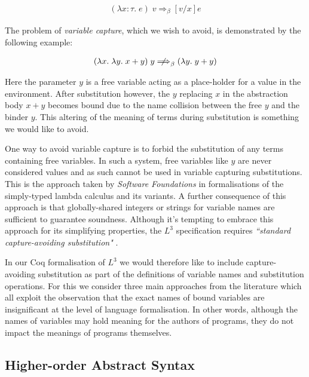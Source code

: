 \documentclass[]{unswthesis}
\let\i\textit
\begin{document}
\begin{eqnarray*}
(\lambda x : \tau. \; e) \; v \Longrightarrow_\beta [v/x]e
\end{eqnarray*}

The problem of \i{variable capture}, which we wish to avoid, is demonstrated by the following example:

\begin{eqnarray*}
(\lambda x. \; \lambda y. \; x + y) \; y \; {\centernot\Longrightarrow}_\beta \; (\lambda y. \; y + y)
\end{eqnarray*}

Here the parameter $y$ is a free variable acting as a place-holder for a value in the environment. After substitution however, the $y$ replacing $x$ in the abstraction body $x + y$ becomes bound due to the name collision between the free $y$ and the binder $y$. This altering of the meaning of terms during substitution is something we would like to avoid.

One way to avoid variable capture is to forbid the substitution of any terms containing free variables. In such a system, free variables like $y$ are never considered values and as such cannot be used in variable capturing substitutions. This is the approach taken by \i{Software Foundations} \cite{pierce15} in formalisations of the simply-typed lambda calculus and its variants. A further consequence of this approach is that globally-shared integers or strings for variable names are sufficient to guarantee soundness. Although it's tempting to embrace this approach for its simplifying properties, the $L^3$ specification requires \i{``standard capture-avoiding substitution"} \cite{ahmed05}.


In our Coq formalisation of $L^3$ we would therefore like to include capture-avoiding substitution as part of the definitions of variable names and substitution operations. For this we consider three main approaches from the literature which all exploit the observation that the exact names of bound variables are insignificant at the level of language formalisation. In other words, although the names of variables may hold meaning for the authors of programs, they do not impact the meanings of programs themselves.

\subsection{Higher-order Abstract Syntax}
\end{document}
